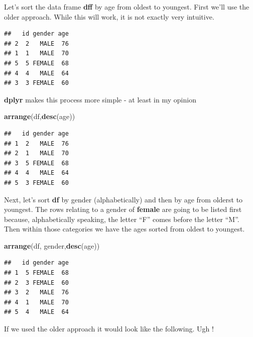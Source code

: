 \documentclass[]{book}
\newenvironment{Shaded}{\begin{snugshade}}{\end{snugshade}}
\newcommand{\KeywordTok}[1]{\textcolor[rgb]{0.13,0.29,0.53}{\textbf{#1}}}
\newcommand{\NormalTok}[1]{#1}
\newcommand{\OperatorTok}[1]{\textcolor[rgb]{0.81,0.36,0.00}{\textbf{#1}}}
\begin{document}
Let's sort the data frame \textbf{dff} by age from oldest to youngest.
First we'll use the older approach. While this will work, it is not exactly very intuitive.

\begin{Shaded}
\end{Shaded}

\begin{verbatim}
##   id gender age
## 2  2   MALE  76
## 1  1   MALE  70
## 5  5 FEMALE  68
## 4  4   MALE  64
## 3  3 FEMALE  60
\end{verbatim}

\textbf{dplyr} makes this process more simple - at least in my opinion

\begin{Shaded}
\begin{Highlighting}[]
\KeywordTok{arrange}\NormalTok{(df,}\KeywordTok{desc}\NormalTok{(age))}
\end{Highlighting}
\end{Shaded}

\begin{verbatim}
##   id gender age
## 1  2   MALE  76
## 2  1   MALE  70
## 3  5 FEMALE  68
## 4  4   MALE  64
## 5  3 FEMALE  60
\end{verbatim}

Next, let's sort \textbf{df} by gender (alphabetically) and then by age
from olderst to youngest. The rows relating to a gender of \textbf{female} are going to be listed first because, alphabetically speaking, the letter ``F'' comes before the letter ``M''. Then within those categories we have the ages sorted from oldest to youngest.

\begin{Shaded}
\begin{Highlighting}[]
\KeywordTok{arrange}\NormalTok{(df, gender,}\KeywordTok{desc}\NormalTok{(age))}
\end{Highlighting}
\end{Shaded}

\begin{verbatim}
##   id gender age
## 1  5 FEMALE  68
## 2  3 FEMALE  60
## 3  2   MALE  76
## 4  1   MALE  70
## 5  4   MALE  64
\end{verbatim}

If we used the older approach it would look like the following. Ugh !
\end{document}
